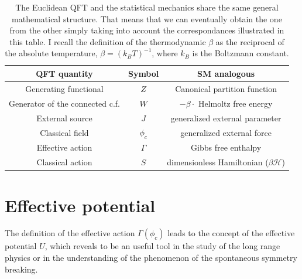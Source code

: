 \begin{table}
  \begin{center}
    \begin{small}
      \begin{tabular}{|c|c|c|}

\hline
 \textbf{QFT quantity}& \textbf{Symbol} & \textbf{SM analogous} \\
\hline
Generating functional& $Z$  & Canonical partition function \\
\hline
Generator of the connected c.f. & $W$  &  $-\beta \cdot$ Helmoltz free energy\\
\hline
External source & $J$ & generalized external parameter \\
\hline
Classical field & $\phi_c$ & generalized external force\\
\hline
Effective action & $\Gamma$ & Gibbs free enthalpy\\
\hline
Classical action & $S$ & dimensionless Hamiltonian ($\beta{\mathcal{H}}$)\\
\hline
      \end{tabular}
    \end{small}
  \end{center}
\caption{The Euclidean QFT and the statistical mechanics share the same general mathematical structure. 
That means that we can eventually obtain the one from the other simply taking into account the correspondances illustrated in this table. 
I recall the definition of the thermodynamic $\beta$ as the reciprocal of the absolute temperature, $\beta = (k_B T)^{-1}$, where $k_B$ is the Boltzmann constant.}
\label{tab:QFTeSM}
\end{table}

\section{Effective potential}
The definition of the effective action $\Gamma(\phi_c)$ leads to the concept of the effective potential $U$,
which reveals to be an useful tool in the study of the long range physics or in the understanding of the phenomenon
of the spontaneous symmetry breaking. 

